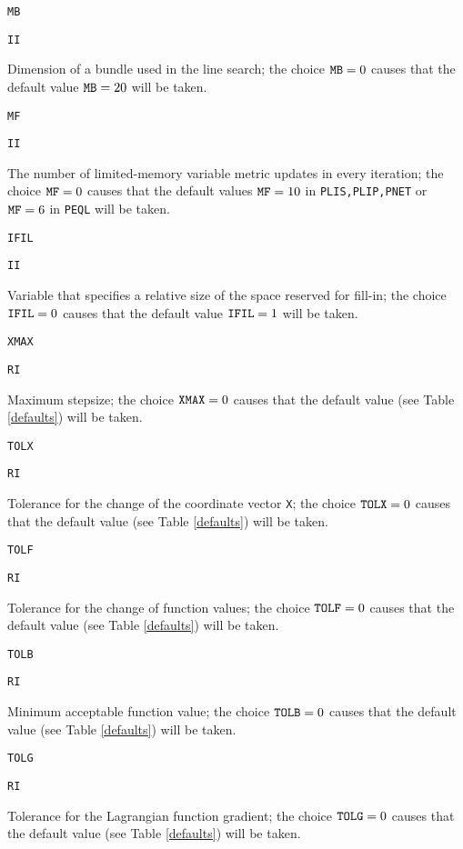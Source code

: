 \documentclass{esub2acm}
\begin{document}
\noindent\parbox{20mm}{\tt MB}\parbox{10mm}{\tt II}\parbox[t]{125mm}{
  Dimension of a bundle used in the line search; the choice ${\tt MB}=0$
  causes that the default value ${\tt MB}=20$ will be taken.}
  \par\vspace{2mm}
\noindent\parbox{20mm}{\tt MF}\parbox{10mm}{\tt II}\parbox[t]{125mm}{
  The number of limited-memory variable metric updates in every iteration;
  the choice ${\tt MF}=0$ causes that the default values ${\tt MF}=10$ in
  {\tt PLIS,PLIP,PNET} or ${\tt MF}=6$ in {\tt PEQL} will be taken.}
  \par\vspace{2mm}
\noindent\parbox{20mm}{\tt IFIL}\parbox{10mm}{\tt II}\parbox[t]{125mm}{
  Variable that specifies a relative size of the space reserved for fill-in; the
  choice ${\tt IFIL}=0$ causes that the default value ${\tt IFIL}=1$ will be taken.}
  \par\vspace{2mm}
\noindent\parbox{20mm}{\tt XMAX}\parbox{10mm}{\tt RI}\parbox[t]{125mm}{
  Maximum stepsize; the choice ${\tt XMAX}=0$ causes that
  the default value (see Table \ref{defaults}) will be taken.}
  \par\vspace{2mm}
\noindent\parbox{20mm}{\tt TOLX}\parbox{10mm}{\tt RI}\parbox[t]{125mm}{
  Tolerance for the change of the coordinate vector {\tt X}; the choice
  ${\tt TOLX}=0$ causes that the default value (see Table \ref{defaults})
  will be taken.}
  \par\vspace{2mm}
\noindent\parbox{20mm}{\tt TOLF}\parbox{10mm}{\tt RI}\parbox[t]{125mm}{
  Tolerance for the change of function values; the choice
  ${\tt TOLF}=0$ causes that the default value (see Table \ref{defaults})
  will be taken.}
  \par\vspace{2mm}
\noindent\parbox{20mm}{\tt TOLB}\parbox{10mm}{\tt RI}\parbox[t]{125mm}{
  Minimum acceptable function value; the choice ${\tt TOLB}=0$ causes that the
  default value (see Table \ref{defaults}) will be taken.}
  \par\vspace{2mm}
\noindent\parbox{20mm}{\tt TOLG}\parbox{10mm}{\tt RI}\parbox[t]{125mm}{
  Tolerance for the Lagrangian function gradient; the choice ${\tt TOLG}=0$ causes
  that the default value (see Table \ref{defaults}) will be taken.}
  \par\vspace{2mm}
\end{document}
